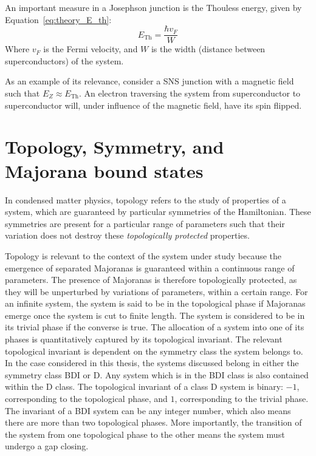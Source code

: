         An important measure in a Josephson junction is the Thouless energy, given by Equation~\eqref{eq:theory_E_th}:
        \begin{equation}
            E_\text{Th} = \frac{\hbar v_F}{W}
            \label{eq:theory_E_th}
        \end{equation}
        Where $v_F$ is the Fermi velocity, and $W$ is the width (distance between superconductors) of the system.

        As an example of its relevance, consider a SNS junction with a magnetic field such that $E_Z \approx E_\text{Th}$.
        An electron traversing the system from superconductor to superconductor will, under influence of the magnetic field, have its spin flipped.

    
\section{Topology, Symmetry, and Majorana bound states}
    In condensed matter physics, topology refers to the study of properties of a system, which are guaranteed by particular symmetries of the Hamiltonian.
    These symmetries are present for a particular range of parameters such that their variation does not destroy these \emph{topologically protected} properties.
    
    Topology is relevant to the context of the system under study because the emergence of separated Majoranas is guaranteed within a continuous range of parameters.
    The presence of Majoranas is therefore topologically protected, as they will be unperturbed by variations of parameters, within a certain range.
    For an infinite system, the system is said to be in the topological phase if Majoranas emerge once the system is cut to finite length.
    The system is considered to be in its trivial phase if the converse is true.
    The allocation of a system into one of its phases is quantitatively captured by its topological invariant.
    The relevant topological invariant is dependent on the symmetry class the system belongs to.
    In the case considered in this thesis, the systems discussed belong in either the symmetry class BDI or D.
    Any system which is in the BDI class is also contained within the D class.
    The topological invariant of a class D system is binary: $-1$, corresponding to the topological phase, and $1$, corresponding to the trivial phase.
    The invariant of a BDI system can be any integer number, which also means there are more than two topological phases.
    More importantly, the transition of the system from one topological phase to the other means the system must undergo a gap closing.



